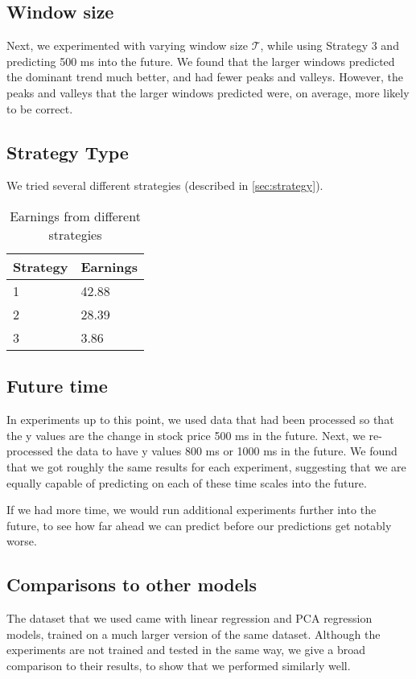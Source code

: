 \documentclass{article} %
\begin{document}


\subsection{Window size}
Next, we experimented with varying window size $\mathcal{T}$, while using Strategy 3 and predicting 500 ms into the future.
We found that the larger windows predicted the dominant trend much better, and had fewer peaks and valleys.
However, the peaks and valleys that the larger windows predicted were, on average, more likely to be correct.

\subsection{Strategy Type}
We tried several different strategies (described in \ref{sec:strategy}).
\begin{table}[h]
	\label{t:miss}
	\centering
	\caption{Earnings from different strategies}
	\begin{tabular}{| l | l |}
	\hline
	Strategy & Earnings \\
	\hline
	1 & 42.88 \\
	2 & 28.39 \\
	3 & 3.86 \\
	\hline
	\end{tabular}
\end{table}


\subsection{Future time}
In experiments up to this point, we used data that had been processed so that the y values are the change in stock price 500 ms in the future.
Next, we re-processed the data to have y values 800 ms or 1000 ms in the future.
We found that we got roughly the same results for each experiment, suggesting that we are equally capable of predicting on each of these time scales into the future.

If we had more time, we would run additional experiments further into the future, to see how far ahead we can predict before our predictions get notably worse.


\subsection{Comparisons to other models}
The dataset that we used came with linear regression and PCA regression models, trained on a much larger version of the same dataset.
Although the experiments are not trained and tested in the same way, we give a broad comparison to their results, to show that we performed similarly well.
\end{document}
